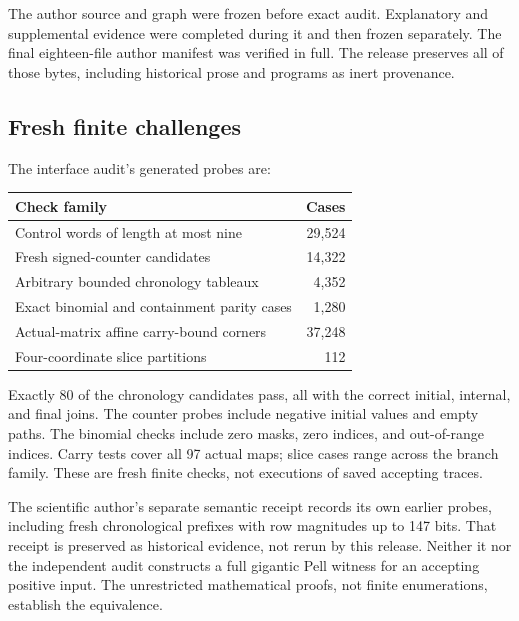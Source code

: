 \documentclass[11pt,letterpaper]{article}
\theoremstyle{definition}
\theoremstyle{remark}
\begin{document}
The author source and graph were frozen before exact audit. Explanatory and supplemental evidence were completed during it and then frozen separately. The final eighteen-file author manifest was verified in full. The release preserves all of those bytes, including historical prose and programs as inert provenance.

\subsection{Fresh finite challenges}
The interface audit's generated probes are:
\begin{center}
\begin{tabular}{lr}
\toprule
Check family & Cases\\
\midrule
Control words of length at most nine & 29,524\\
Fresh signed-counter candidates & 14,322\\
Arbitrary bounded chronology tableaux & 4,352\\
Exact binomial and containment parity cases & 1,280\\
Actual-matrix affine carry-bound corners & 37,248\\
Four-coordinate slice partitions & 112\\
\bottomrule
\end{tabular}
\end{center}
Exactly 80 of the chronology candidates pass, all with the correct initial, internal, and final joins. The counter probes include negative initial values and empty paths. The binomial checks include zero masks, zero indices, and out-of-range indices. Carry tests cover all 97 actual maps; slice cases range across the branch family. These are fresh finite checks, not executions of saved accepting traces.

The scientific author's separate semantic receipt records its own earlier probes, including fresh chronological prefixes with row magnitudes up to 147 bits. That receipt is preserved as historical evidence, not rerun by this release. Neither it nor the independent audit constructs a full gigantic Pell witness for an accepting positive input. The unrestricted mathematical proofs, not finite enumerations, establish the equivalence.
\end{document}
